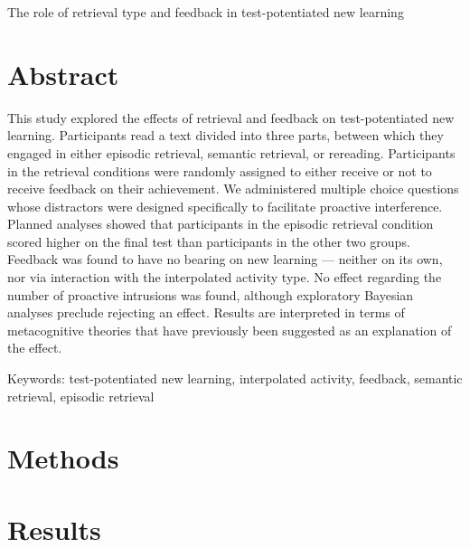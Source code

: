 \documentclass[12pt]{article}
\newcommand\specialsection{%
    \titleformat{\section}{\centering\normalsize\rmfamily}{}{0pt}{}
}
\newcommand\regularsection{%
    \titleformat{\section}{\centering\normalsize\rmfamily\bfseries}{}{0pt}{}
}
\def\biblio{}
\begin{document}
\def\biblio{}

\specialsection


{\centering
	The role of retrieval type and feedback in 
	test-potentiated new learning\par}


\section{Abstract}

This study explored the effects of retrieval and feedback 
on test-potentiated new learning. Participants read a text 
divided into three parts, between which they engaged in 
either episodic retrieval, semantic retrieval, or 
rereading. Participants in the retrieval conditions were 
randomly assigned to either receive or not to receive 
feedback on their achievement. We administered multiple 
choice questions whose distractors were designed 
specifically to facilitate proactive interference. Planned 
analyses showed that participants in the episodic retrieval 
condition scored higher on the final test than participants 
in the other two groups. Feedback was found to have no 
bearing on new learning --- neither on its own, nor via 
interaction with the interpolated activity type. No effect 
regarding the number of proactive intrusions was found, 
although exploratory Bayesian analyses preclude rejecting 
an effect. Results are interpreted in terms of 
metacognitive theories that have previously been suggested 
as an explanation of the effect.

\bigskip

\noindent Keywords: test-potentiated new learning, interpolated activity, 
feedback, semantic retrieval, episodic retrieval

\newpage

\hypertarget{introduction}{%
}



\regularsection

\hypertarget{methods}{%
\section{Methods}}



\hypertarget{results}{%
\section{Results}}
\end{document}
